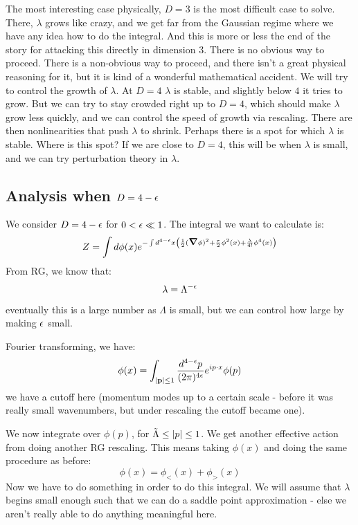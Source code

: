 The most interesting case physically, $D = 3$ is the most difficult case to solve. There, $\lambda$ grows like crazy, and we get far from the Gaussian regime where we have any idea how to do the integral. And this is more or less the end of the story for attacking this directly in dimension 3. There is no obvious way to proceed. There is a non-obvious way to proceed, and there isn't a great physical reasoning for it, but it is kind of a wonderful mathematical accident. We will try to control the growth of $\lambda$. At $D = 4$ $\lambda$ is stable, and slightly below $4$ it tries to grow. But we can try to stay crowded right up to $D = 4$, which should make $\lambda$ grow less quickly, and we can control the speed of growth via rescaling. There are then nonlinearities that push $\lambda$ to shrink. Perhaps there is a spot for which $\lambda$ is stable. Where is this spot?  If we are close to $D = 4$, this will be when $\lambda$ is small, and we can try perturbation theory in $\lambda$. 

\subsection{Analysis when $D = 4 - \epsilon$}
We consider $D = 4 - \epsilon$ for $0 < \epsilon \ll 1$. The integral we want to calculate is:
\begin{equation}
    Z = \int d\phi(x) e^{-\int d^{4-\e}x \left(\frac{1}{2}(\nabla \phi)^2 + \frac{\tau}{2}\phi^2(x) + \frac{\lambda}{4!}\phi^4(x)\right)}
\end{equation}
From RG, we know that:
\begin{equation}
    \lambda = \Lambda^{-\epsilon}
\end{equation}
eventually this is a large number as $\Lambda$ is small, but we can control how large by making $\epsilon$ small.

Fourier transforming, we have:
\begin{equation}
    \phi(x) = \int_{\abs{\v{p}} \leq 1} \frac{d^{4-\e}p}{(2\pi)^{4\e}}e^{ip \cdot x}\phi(p)
\end{equation}
we have a cutoff here (momentum modes up to a certain scale - before it was really small wavenumbers, but under rescaling the cutoff became one).

We now integrate over $\phi(p)$, for $\tilde{\Lambda} \leq \lvert p \rvert \leq 1$. We get another effective action from doing another RG rescaling. This means taking $\phi(x)$ and doing the same procedure as before:
\begin{equation}
    \phi(x) = \phi_<(x) + \phi_>(x)
\end{equation}
Now we have to do something in order to do this integral. We will assume that $\lambda$ begins small enough such that we can do a saddle point approximation - else we aren't really able to do anything meaningful here.

